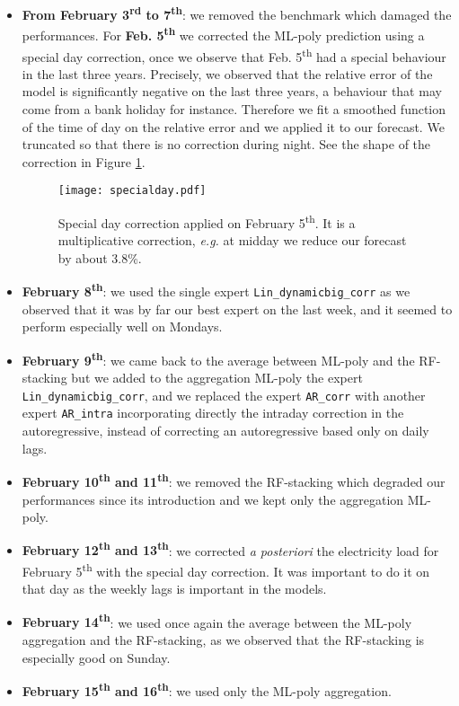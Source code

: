 \documentclass[transmag]{IEEEtran}
\begin{document}
\begin{itemize}
\item
\textbf{From February 3\textsuperscript{rd} to 7\textsuperscript{th}}: we removed the benchmark which damaged the performances. For \textbf{Feb. 5\textsuperscript{th}} we corrected the ML-poly prediction using a special day correction, once we observe that Feb. 5\textsuperscript{th} had a special behaviour in the last three years. Precisely, we observed that the relative error of the model is significantly negative on the last three years, a behaviour that may come from a bank holiday for instance. Therefore we fit a smoothed function of the time of day on the relative error and we applied it to our forecast. We truncated so that there is no correction during night. See the shape of the correction in Figure \ref{fig:specialday}.
\begin{figure}
    \centering
    \texttt{[image: specialday.pdf]}
    \caption{Special day correction applied on February 5\textsuperscript{th}. It is a multiplicative correction, {\it e.g.} at midday we reduce our forecast by about 3.8\%.}
    \label{fig:specialday}
\end{figure}

\item
\textbf{February 8\textsuperscript{th}}: we used the single expert \texttt{Lin\_dynamicbig\_corr} as we observed that it was by far our best expert on the last week, and it seemed to perform especially well on Mondays.

\item
\textbf{February 9\textsuperscript{th}}: we came back to the average between ML-poly and the RF-stacking but we added to the aggregation ML-poly the expert \texttt{Lin\_dynamicbig\_corr}, and we replaced the expert \texttt{AR\_corr} with another expert \texttt{AR\_intra} incorporating directly the intraday correction in the autoregressive, instead of correcting an autoregressive based only on daily lags.

\item
\textbf{February 10\textsuperscript{th} and 11\textsuperscript{th}}: we removed the RF-stacking which degraded our performances since its introduction and we kept only the aggregation ML-poly.

\item
\textbf{February 12\textsuperscript{th} and 13\textsuperscript{th}}:
we corrected {\it a posteriori} the electricity load for February 5\textsuperscript{th} with the special day correction. It was important to do it on that day as the weekly lags is important in the models.

\item
\textbf{February 14\textsuperscript{th}}: we used once again the average between the ML-poly aggregation and the RF-stacking, as we observed that the RF-stacking is especially good on Sunday.

\item
\textbf{February 15\textsuperscript{th} and 16\textsuperscript{th}}: we used only the ML-poly aggregation.
\end{itemize}
\end{document}
